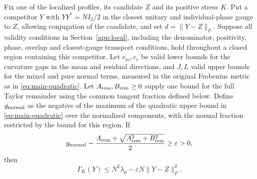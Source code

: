 \begin{proposition}
\label{prop:conditional-local}
Fix one of the localized profiles, its candidate $Z$ and its positive
stress $K$. Put a competitor $Y$ with $YY^*=NI_2/2$ in the
closest unitary and individual-phase gauge to $Z$, allowing conjugation
of the candidate, and set $d=\|Y-Z\|_F$. Suppose all validity conditions
in Section~\ref{app:local}, including the denominator, positivity, phase,
overlap and closest-gauge transport conditions, hold throughout a closed
region containing this competitor. Let $c_m,c_r$ be valid lower bounds
for the curvature gaps in the mean and residual directions, and $J,L$
valid upper bounds for
the mixed and pure normal terms, measured in the original Frobenius
metric as in \eqref{eq:main-quadratic}. Let
$A_{\rm rem},B_{\rm rem}\ge0$ supply one bound for the full Taylor
remainder using the common tangent fraction defined below. Define
$g_{\rm normal}$ as the negative of the maximum of the quadratic upper
bound in \eqref{eq:main-quadratic} over the normalized components, with
the normal fraction restricted by the bound for this region. If
\[
 g_{\rm normal}-\frac{A_{\rm rem}+
          \sqrt{A_{\rm rem}^2+B_{\rm rem}^2}}2\ge\varepsilon>0,
\]
then
\begin{equation}\label{eq:conditional-comparison}
 \Gamma_K(Y)\le N^2\lambda_p-\varepsilon N\|Y-Z\|_F^2.
\end{equation}
\end{proposition}
